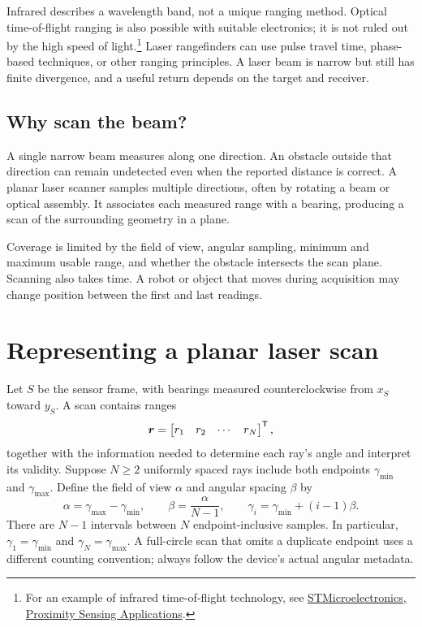 Infrared describes a wavelength band, not a unique ranging method.
Optical time-of-flight ranging is also possible with suitable electronics;
it is not ruled out by the high speed of light.\footnote{For an example of
infrared time-of-flight technology, see
\href{https://www.st.com/en/applications/sensing/proximity-ranging-sensing.html}{STMicroelectronics, Proximity Sensing Applications}.}
Laser rangefinders can use pulse travel time, phase-based techniques, or
other ranging principles. A laser beam is narrow but still has finite
divergence, and a useful return depends on the target and receiver.

\subsection{Why scan the beam?}
A single narrow beam measures along one direction. An obstacle outside that
direction can remain undetected even when the reported distance is correct.
A planar laser scanner samples multiple directions, often by rotating a
beam or optical assembly. It associates each measured range with a bearing,
producing a scan of the surrounding geometry in a plane.

Coverage is limited by the field of view, angular sampling, minimum and
maximum usable range, and whether the obstacle intersects the scan plane.
Scanning also takes time. A robot or object that moves during acquisition
may change position between the first and last readings.

\section{Representing a planar laser scan}
Let $S$ be the sensor frame, with bearings measured counterclockwise from
$x_S$ toward $y_S$. A scan contains ranges
\[
 \boldsymbol r=\begin{bmatrix}r_1&r_2&\cdots&r_N\end{bmatrix}^{\mathsf T},
\]
together with the information needed to determine each ray's angle and
interpret its validity. Suppose $N\ge2$ uniformly spaced rays include both
endpoints $\gamma_{\min}$ and $\gamma_{\max}$. Define the field of view
$\alpha$ and angular spacing $\beta$ by
\begin{equation}
 \alpha=\gamma_{\max}-\gamma_{\min},\qquad
 \boxed{\beta=\frac{\alpha}{N-1}},\qquad
 \boxed{\gamma_i=\gamma_{\min}+(i-1)\beta}.
 \label{eq:l06-angles}
\end{equation}
There are $N-1$ intervals between $N$ endpoint-inclusive samples. In
particular, $\gamma_1=\gamma_{\min}$ and $\gamma_N=\gamma_{\max}$.
A full-circle scan that omits a duplicate endpoint uses a different counting
convention; always follow the device's actual angular metadata.


